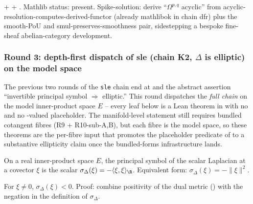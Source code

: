 \begin{lemma}
\label{lem:dfs-r15}
 +  + .  Mathlib status: present.  Spike-solution: derive ``$\Omega^{p,q}$ acyclic'' from acyclic-resolution-computes-derived-functor (already mathlibok in chain dfr) plus the smooth-PoU and smul-preserves-smoothness pair, sidestepping a bespoke fine-sheaf abelian-category development.
\leanok\mathlibok
\end{lemma}

\subsubsection*{Round 3: depth-first dispatch of sle (chain K2,
$\Delta$ is elliptic) on the model space}
\label{subsubsec:sle-round-3}

The previous two rounds of the \texttt{sle} chain end at
 and the abstract assertion ``invertible
principal symbol $\Rightarrow$ elliptic.''  This round dispatches the
\emph{full chain} on the model inner-product space $E$ -- every leaf
below is a Lean theorem in
 with no
 and no -valued placeholder.  The
manifold-level statement still requires bundled cotangent fibres
(R9 + R10-sub-A,B), but each fibre is the model space, so these
theorems are the per-fibre input that promotes the placeholder
 predicate of  to a substantive
ellipticity claim once the bundled-forms infrastructure lands.

\begin{lemma}
\label{lem:sle-r11}
On a real inner-product space $E$, the principal symbol of the
scalar Laplacian at a covector $\xi$ is the scalar
$\sigma_{\Delta}(\xi) = -\langle \xi, \xi\rangle_{\R}$.  Equivalent
form: $\sigma_{\Delta}(\xi) = -\|\xi\|^{2}$.
\leanok
\end{lemma}

\begin{lemma}
\label{lem:sle-r12}
For $\xi \neq 0$, $\sigma_{\Delta}(\xi) < 0$.  Proof: combine
positivity of the dual metric () with
the negation in the definition of $\sigma_{\Delta}$.
\leanok
\end{lemma}

